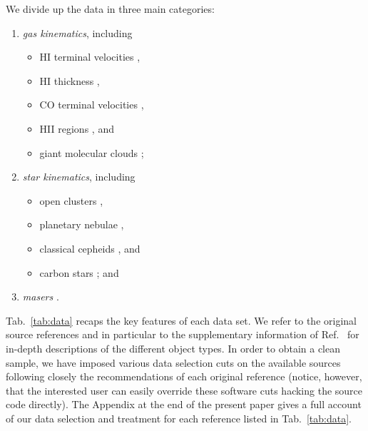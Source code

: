\documentclass[twocolumn,prd,reprint,preprintnumbers,amsmath,amssymb,superscriptaddress,nofootinbib]{revtex4}
\begin{document}
\par We divide up the data in three main categories:
\begin{enumerate}\itemsep1pt \parskip0pt 
\item \emph{gas kinematics}, including
\begin{itemize}\itemsep1pt \parskip0pt 
\item HI terminal velocities \cite{Fich1989,Malhotra1995,McClure-GriffithsDickey2007},
\item HI thickness \cite{HonmaSofue1997},
\item CO terminal velocities \cite{BurtonGordon1978,Clemens1985,Knapp1985,Luna2006},
\item HII regions \cite{Blitz1979,Fich1989,TurbideMoffat1993,BrandBlitz1993,Hou2009}, and
\item giant molecular clouds \cite{Hou2009};
\end{itemize}

\item \emph{star kinematics}, including
\begin{itemize}\itemsep1pt \parskip0pt 
\item open clusters \cite{FrinchaboyMajewski2008},
\item planetary nebulae \cite{Durand1998},
\item classical cepheids \cite{Pont1994,Pont1997}, and
\item carbon stars \cite{DemersBattinelli2007,Battinelli2013}; and
\end{itemize}

\item \emph{masers} \cite{Reid2014,Honma2012,StepanishchevBobylev2011,Xu2013,BobylevBajkova2013}.
\end{enumerate}
Tab.~\ref{tab:data} recaps the key features of each data set. We refer to the original source references and in particular to the supplementary information of Ref.~\cite{2015NatPh..11..245I} for in-depth descriptions of the different object types. In order to obtain a clean sample, we have imposed various data selection cuts on the available sources following closely the recommendations of each original reference (notice, however, that the interested user can easily override these software cuts hacking the source code directly). The Appendix at the end of the present paper gives a full account of our data selection and treatment for each reference listed in Tab.~\ref{tab:data}.
\end{document}
